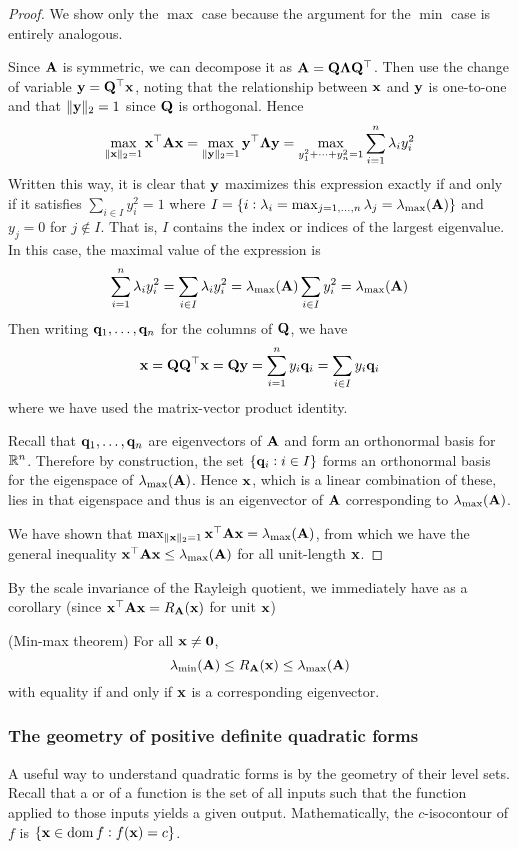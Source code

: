 \begin{proof}
We show only the $\max$ case because the argument for the $\min$ case is entirely analogous.

Since $\mathbf{A}$ is symmetric, we can decompose it as $\mathbf{A} = \mathbf{Q}\mathbf{\Lambda}\mathbf{Q}^\top$.
Then use the change of variable $\mathbf{y} = \mathbf{Q}^\top\mathbf{x}$, noting that the relationship between $\mathbf{x}$ and $\mathbf{y}$ is one-to-one and that $\|\mathbf{y}\|_2 = 1$ since $\mathbf{Q}$ is orthogonal.
Hence
\[\max_{\|\mathbf{x}\|_2 = 1} \mathbf{x}^\top\mathbf{A}\mathbf{x} = \max_{\|\mathbf{y}\|_2 = 1} \mathbf{y}^\top\mathbf{\Lambda}\mathbf{y} = \max_{y_1^2+\dots+y_n^2=1} \sum_{i=1}^n \lambda_i y_i^2\]
Written this way, it is clear that $\mathbf{y}$ maximizes this expression exactly if and only if it satisfies $\sum_{i \in I} y_i^2 = 1$ where $I = \{i : \lambda_i = \max_{j=1,\dots,n} \lambda_j = \lambda_{\max}(\mathbf{A})\}$ and $y_j = 0$ for $j \not\in I$.
That is, $I$ contains the index or indices of the largest eigenvalue.
In this case, the maximal value of the expression is
\[\sum_{i=1}^n \lambda_i y_i^2 = \sum_{i \in I} \lambda_i y_i^2 = \lambda_{\max}(\mathbf{A}) \sum_{i \in I} y_i^2 = \lambda_{\max}(\mathbf{A})\]
Then writing $\mathbf{q}_1, \dots, \mathbf{q}_n$ for the columns of $\mathbf{Q}$, we have
\[\mathbf{x} = \mathbf{Q}\mathbf{Q}^\top\mathbf{x} = \mathbf{Q}\mathbf{y} = \sum_{i=1}^n y_i\mathbf{q}_i = \sum_{i \in I} y_i\mathbf{q}_i\]
where we have used the matrix-vector product identity.

Recall that $\mathbf{q}_1, \dots, \mathbf{q}_n$ are eigenvectors of $\mathbf{A}$ and form an orthonormal basis for $\mathbb{R}^n$.
Therefore by construction, the set $\{\mathbf{q}_i : i \in I\}$ forms an orthonormal basis for the eigenspace of $\lambda_{\max}(\mathbf{A})$.
Hence $\mathbf{x}$, which is a linear combination of these, lies in that eigenspace and thus is an eigenvector of $\mathbf{A}$ corresponding to $\lambda_{\max}(\mathbf{A})$.

We have shown that $\max_{\|\mathbf{x}\|_2 = 1} \mathbf{x}^\top\mathbf{A}\mathbf{x} = \lambda_{\max}(\mathbf{A})$, from which we have the general inequality $\mathbf{x}^\top\mathbf{A}\mathbf{x} \leq \lambda_{\max}(\mathbf{A})$ for all unit-length $\mathbf{x}$.
\end{proof}
By the scale invariance of the Rayleigh quotient, we immediately have as a corollary (since $\mathbf{x}^\top\mathbf{A}\mathbf{x} = R_{\mathbf{A}}(\mathbf{x})$ for unit $\mathbf{x}$)
\begin{theorem}
(Min-max theorem)
For all $\mathbf{x} \neq \mathbf{0}$,
\[\lambda_{\min}(\mathbf{A}) \leq R_{\mathbf{A}}(\mathbf{x}) \leq \lambda_{\max}(\mathbf{A})\]
with equality if and only if $\mathbf{x}$ is a corresponding eigenvector.
\end{theorem}

\subsubsection{The geometry of positive definite quadratic forms}
A useful way to understand quadratic forms is by the geometry of their level sets.
Recall that a  or  of a function is the set of all inputs such that the function applied to those inputs yields a given output.
Mathematically, the $c$-isocontour of $f$ is $\{\mathbf{x} \in \operatorname*{dom} f : f(\mathbf{x}) = c\}$.

